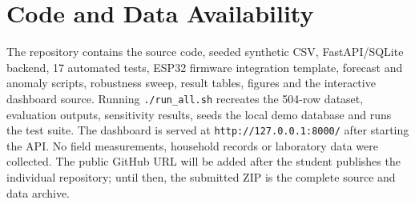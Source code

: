 \documentclass[10pt,letterpaper,twocolumn]{article}
\begin{document}
\section{Code and Data Availability}
The repository contains the source code, seeded synthetic CSV, FastAPI/SQLite backend, 17 automated tests, ESP32 firmware integration template, forecast and anomaly scripts, robustness sweep, result tables, figures and the interactive dashboard source. Running \texttt{./run\_all.sh} recreates the 504-row dataset, evaluation outputs, sensitivity results, seeds the local demo database and runs the test suite. The dashboard is served at \texttt{http://127.0.0.1:8000/} after starting the API. No field measurements, household records or laboratory data were collected. The public GitHub URL will be added after the student publishes the individual repository; until then, the submitted ZIP is the complete source and data archive.
\end{document}
